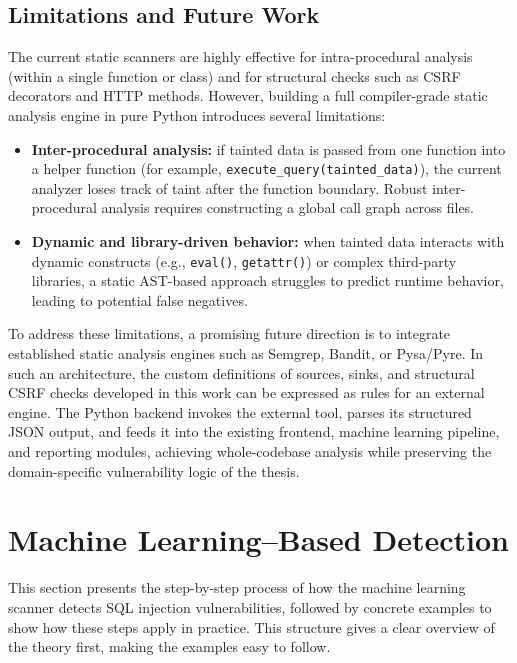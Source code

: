 \subsection{Limitations and Future Work}
\label{sec:static_limitations}

The current static scanners are highly effective for intra-procedural analysis (within a single function or class) and for structural checks such as CSRF decorators and HTTP methods. However, building a full compiler-grade static analysis engine in pure Python introduces several limitations:
\begin{itemize}
  \item \textbf{Inter-procedural analysis:} if tainted data is passed from one function into a helper function (for example, \texttt{execute\_query(tainted\_data)}), the current analyzer loses track of taint after the function boundary. Robust inter-procedural analysis requires constructing a global call graph across files.
  \item \textbf{Dynamic and library-driven behavior:} when tainted data interacts with dynamic constructs (e.g., \texttt{eval()}, \texttt{getattr()}) or complex third-party libraries, a static AST-based approach struggles to predict runtime behavior, leading to potential false negatives.
\end{itemize}

To address these limitations, a promising future direction is to integrate established static analysis engines such as Semgrep, Bandit, or Pysa/Pyre. In such an architecture, the custom definitions of sources, sinks, and structural CSRF checks developed in this work can be expressed as rules for an external engine. The Python backend invokes the external tool, parses its structured JSON output, and feeds it into the existing frontend, machine learning pipeline, and reporting modules, achieving whole-codebase analysis while preserving the domain-specific vulnerability logic of the thesis.

\section{Machine Learning--Based Detection}
\label{sec:ml_detection}

This section presents the step-by-step process of how the machine learning scanner
detects SQL injection vulnerabilities, followed by concrete examples to show how these
steps apply in practice. This structure gives a clear overview of the theory first, making
the examples easy to follow.

